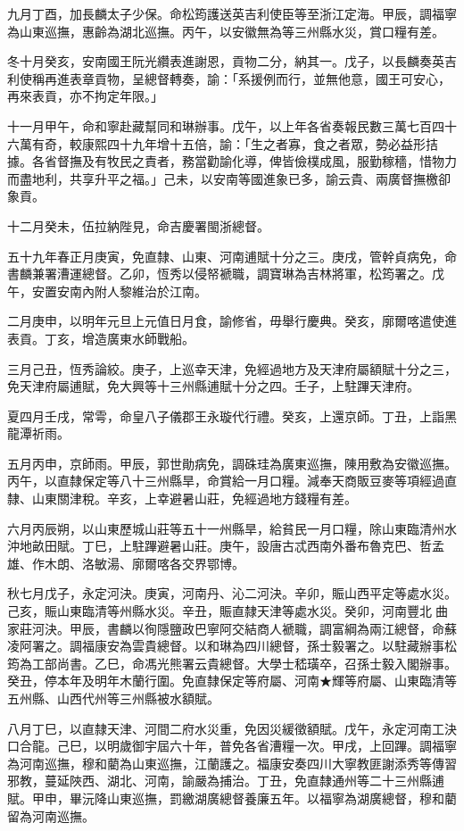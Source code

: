 \begin{pinyinscope}
九月丁酉，加長麟太子少保。命松筠護送英吉利使臣等至浙江定海。甲辰，調福寧為山東巡撫，惠齡為湖北巡撫。丙午，以安徽無為等三州縣水災，賞口糧有差。

冬十月癸亥，安南國王阮光纘表進謝恩，貢物二分，納其一。戊子，以長麟奏英吉利使稱再進表章貢物，呈總督轉奏，諭：「系援例而行，並無他意，國王可安心，再來表貢，亦不拘定年限。」

十一月甲午，命和寧赴藏幫同和琳辦事。戊午，以上年各省奏報民數三萬七百四十六萬有奇，較康熙四十九年增十五倍，諭：「生之者寡，食之者眾，勢必益形拮據。各省督撫及有牧民之責者，務當勸諭化導，俾皆儉樸成風，服勤稼穡，惜物力而盡地利，共享升平之福。」己未，以安南等國進象已多，諭云貴、兩廣督撫檄卻象貢。

十二月癸未，伍拉納陛見，命吉慶署閩浙總督。

五十九年春正月庚寅，免直隸、山東、河南逋賦十分之三。庚戌，管幹貞病免，命書麟兼署漕運總督。乙卯，恆秀以侵帑褫職，調寶琳為吉林將軍，松筠署之。戊午，安置安南內附人黎維治於江南。

二月庚申，以明年元旦上元值日月食，諭修省，毋舉行慶典。癸亥，廓爾喀遣使進表貢。丁亥，增造廣東水師戰船。

三月己丑，恆秀論絞。庚子，上巡幸天津，免經過地方及天津府屬額賦十分之三，免天津府屬逋賦，免大興等十三州縣逋賦十分之四。壬子，上駐蹕天津府。

夏四月壬戌，常雩，命皇八子儀郡王永璇代行禮。癸亥，上還京師。丁丑，上詣黑龍潭祈雨。

五月丙申，京師雨。甲辰，郭世勛病免，調硃珪為廣東巡撫，陳用敷為安徽巡撫。丙午，以直隸保定等八十三州縣旱，命賞給一月口糧。減奉天商販豆麥等項經過直隸、山東關津稅。辛亥，上幸避暑山莊，免經過地方錢糧有差。

六月丙辰朔，以山東歷城山莊等五十一州縣旱，給貧民一月口糧，除山東臨清州水沖地畝田賦。丁巳，上駐蹕避暑山莊。庚午，設唐古忒西南外番布魯克巴、哲孟雄、作木朗、洛敏湯、廓爾喀各交界鄂博。

秋七月戊子，永定河決。庚寅，河南丹、沁二河決。辛卯，賑山西平定等處水災。己亥，賑山東臨清等州縣水災。辛丑，賑直隸天津等處水災。癸卯，河南豐北曲家莊河決。甲辰，書麟以徇隱鹽政巴寧阿交結商人褫職，調富綱為兩江總督，命蘇凌阿署之。調福康安為雲貴總督。以和琳為四川總督，孫士毅署之。以駐藏辦事松筠為工部尚書。乙巳，命馮光熊署云貴總督。大學士嵇璜卒，召孫士毅入閣辦事。癸丑，停本年及明年木蘭行圍。免直隸保定等府屬、河南★輝等府屬、山東臨清等五州縣、山西代州等三州縣被水額賦。

八月丁巳，以直隸天津、河間二府水災重，免因災緩徵額賦。戊午，永定河南工決口合龍。己巳，以明歲御宇屆六十年，普免各省漕糧一次。甲戌，上回蹕。調福寧為河南巡撫，穆和藺為山東巡撫，江蘭護之。福康安奏四川大寧教匪謝添秀等傳習邪教，蔓延陜西、湖北、河南，諭嚴為捕治。丁丑，免直隸通州等二十三州縣逋賦。甲申，畢沅降山東巡撫，罰繳湖廣總督養廉五年。以福寧為湖廣總督，穆和藺留為河南巡撫。


\end{pinyinscope}
